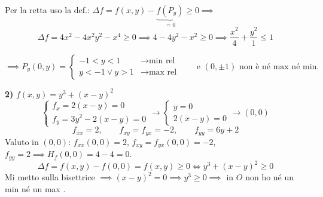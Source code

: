 \begin{esercizio}
Per la retta uso la def.: $\Delta f = f(x, y) - \underbrace{f(P_y)}_{= 0} \ge 0 \implies$
\[
\Delta f = 4x^2 - 4x^2 y^2 - x^4 \ge 0 \implies 4 - 4y^2 - x^2 \ge 0 \implies \frac{x^2}{4} + \frac{y^2}{1} \le 1
\]
\begin{center}
\end{center}
\[
\implies P_y(0, y) = \begin{cases}
-1 < y < 1 & \to \text{min rel} \\
y < -1 \lor y > 1 & \to \text{max rel}
\end{cases}
\qquad \text{e } (0, \pm 1) \text{ non è né max né min.}
\]

\textbf{2)} $f(x, y) = y^3 + (x - y)^2$
\[
\begin{cases}
f_x = 2(x - y) = 0 \\
f_y = 3y^2 - 2(x - y) = 0
\end{cases}
\to
\begin{cases}
y = 0 \\
2(x - y) = 0
\end{cases}
\to (0, 0)
\]
\[
f_{xx} = 2, \qquad f_{xy} = f_{yx} = -2, \qquad f_{yy} = 6y + 2
\]
Valuto in $(0, 0)$: $f_{xx}(0, 0) = 2$, $f_{xy} = f_{yx}(0, 0) = -2$, $f_{yy} = 2 \implies H_f(0, 0) = 4 - 4 = 0$.
\[
\Delta f = f(x, y) - f(0, 0) = f(x, y) \ge 0 \iff y^3 + (x - y)^2 \ge 0
\]
Mi metto sulla bisettrice $\implies (x - y)^2 = 0 \implies y^3 \ge 0 \implies$ in $O$ non ho né un min né un max .
\end{esercizio}

